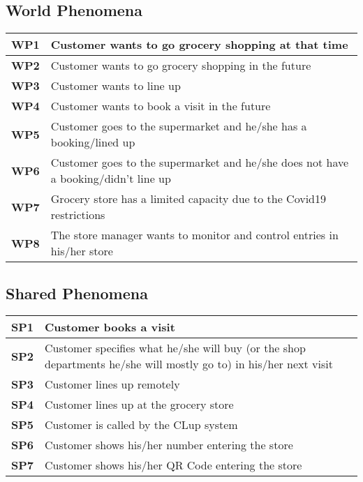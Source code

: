 \subsection{World Phenomena} %
\begin{center}
    {\renewcommand{\arraystretch}{2.4}%
    \begin{tabular}{L{2cm}L{14cm}}
        \hline
        \textbf{WP1} & Customer wants to go grocery shopping at that time \\
        \hline
        \textbf{WP2} & Customer wants to go grocery shopping in the future \\
        \hline
        \textbf{WP3} & Customer wants to line up \\
        \hline
        \textbf{WP4} & Customer wants to book a visit in the future \\
        \hline
        \textbf{WP5} & Customer goes to the supermarket and he/she has a booking/lined up \\
        \hline
        \textbf{WP6} & Customer goes to the supermarket and he/she does not have a booking/didn't line up \\
        \hline
        \textbf{WP7} & Grocery store has a limited capacity due to the Covid19 restrictions \\
        \hline
        \textbf{WP8} & The store manager wants to monitor and control entries in his/her store \\
        \hline
    \end{tabular}}
\end{center}

\subsection{Shared Phenomena}
\begin{center}
    {\renewcommand{\arraystretch}{2.4}%
    \begin{tabular}{L{2cm}L{14cm}}
        \hline
        \textbf{SP1} & Customer books a visit \\
        \hline
        \textbf{SP2} & Customer specifies what he/she will buy (or the shop departments he/she will mostly go to) in his/her next visit \\
        \hline
        \textbf{SP3} & Customer lines up remotely \\
        \hline
        \textbf{SP4} & Customer lines up at the grocery store \\
        \hline
        \textbf{SP5} & Customer is called by the CLup system \\
        \hline
        \textbf{SP6} & Customer shows his/her number entering the store \\
        \hline
        \textbf{SP7} & Customer shows his/her QR Code entering the store \\
        \hline
    \end{tabular}}
\end{center}

